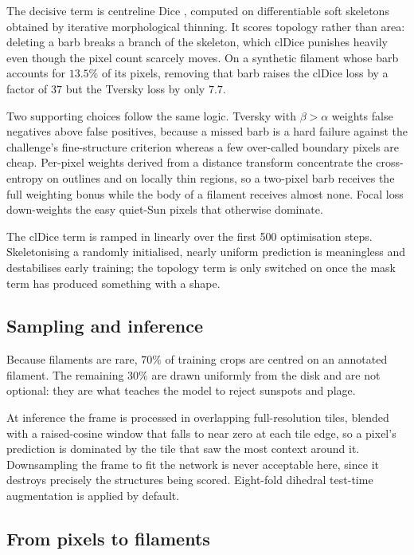 \documentclass[11pt]{article}
\begin{document}
The decisive term is centreline Dice \cite{cldice2021}, computed on
differentiable soft skeletons obtained by iterative morphological thinning. It
scores topology rather than area: deleting a barb breaks a branch of the
skeleton, which clDice punishes heavily even though the pixel count scarcely
moves. On a synthetic filament whose barb accounts for $13.5\%$ of its pixels,
removing that barb raises the clDice loss by a factor of $37$ but the Tversky
loss \cite{tversky2017} by only $7.7$.

Two supporting choices follow the same logic. Tversky with $\beta > \alpha$
weights false negatives above false positives, because a missed barb is a hard
failure against the challenge's fine-structure criterion whereas a few
over-called boundary pixels are cheap. Per-pixel weights derived from a
distance transform concentrate the cross-entropy on outlines and on locally
thin regions, so a two-pixel barb receives the full weighting bonus while the
body of a filament receives almost none. Focal loss \cite{focal2017}
down-weights the easy quiet-Sun pixels that otherwise dominate.

The clDice term is ramped in linearly over the first 500 optimisation steps.
Skeletonising a randomly initialised, nearly uniform prediction is meaningless
and destabilises early training; the topology term is only switched on once the
mask term has produced something with a shape.

\subsection{Sampling and inference}

Because filaments are rare, $70\%$ of training crops are centred on an
annotated filament. The remaining $30\%$ are drawn uniformly from the disk and
are not optional: they are what teaches the model to reject sunspots and plage.

At inference the frame is processed in overlapping full-resolution tiles,
blended with a raised-cosine window that falls to near zero at each tile edge,
so a pixel's prediction is dominated by the tile that saw the most context
around it. Downsampling the frame to fit the network is never acceptable here,
since it destroys precisely the structures being scored. Eight-fold dihedral
test-time augmentation is applied by default.

\subsection{From pixels to filaments}
\end{document}
